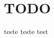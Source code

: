 \documentclass[11pt]{article}
\date{\today}
\title{}
\begin{document}
\tableofcontents

\section{{\bfseries\sffamily TODO} }
\label{sec:org42d615e}
teste teste test
\end{document}
